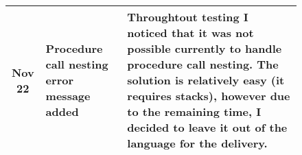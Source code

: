 \begin{figure}[h]
\begin{tabular}{cp{1.25in}p{2.5in}}
        \midrule
        Nov 22 & Procedure call \newline nesting error \newline message added &
        Throughtout testing I noticed that it was not possible currently to
        handle procedure call nesting. The solution is relatively easy
        (it requires stacks), however due to the remaining time, I decided to
        leave it out of the language for the delivery.\\

        \bottomrule
    \end{tabular}
\end{figure}
